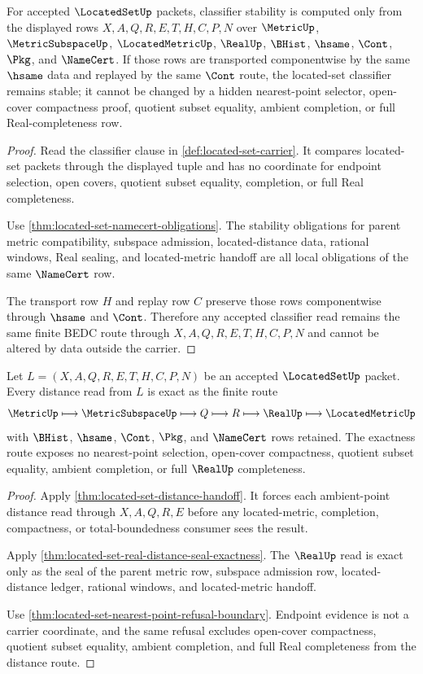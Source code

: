 \begin{theorem}
\label{thm:located-set-classifier-stability}
For accepted $\LocatedSetUp$ packets, classifier stability is computed only from the displayed rows $X,A,Q,R,E,T,H,C,P,N$ over $\MetricUp$, $\MetricSubspaceUp$, $\LocatedMetricUp$, $\RealUp$, $\BHist$, $\hsame$, $\Cont$, $\Pkg$, and $\NameCert$. If those rows are transported componentwise by the same $\hsame$ data and replayed by the same $\Cont$ route, the located-set classifier remains stable; it cannot be changed by a hidden nearest-point selector, open-cover compactness proof, quotient subset equality, ambient completion, or full Real-completeness row.
\end{theorem}
\begin{proof}
Read the classifier clause in \autoref{def:located-set-carrier}. It compares located-set packets through the displayed tuple and has no coordinate for endpoint selection, open covers, quotient subset equality, completion, or full Real completeness.

Use \autoref{thm:located-set-namecert-obligations}. The stability obligations for parent metric compatibility, subspace admission, located-distance data, rational windows, Real sealing, and located-metric handoff are all local obligations of the same $\NameCert$ row.

The transport row $H$ and replay row $C$ preserve those rows componentwise through $\hsame$ and $\Cont$. Therefore any accepted classifier read remains the same finite BEDC route through $X,A,Q,R,E,T,H,C,P,N$ and cannot be altered by data outside the carrier.
\end{proof}

\begin{theorem}
\label{thm:located-set-distance-exactness}
Let $L=(X,A,Q,R,E,T,H,C,P,N)$ be an accepted $\LocatedSetUp$ packet. Every distance read from $L$ is exact as the finite route
$$
\MetricUp \longmapsto \MetricSubspaceUp \longmapsto Q \longmapsto R \longmapsto \RealUp \longmapsto \LocatedMetricUp
$$
with $\BHist$, $\hsame$, $\Cont$, $\Pkg$, and $\NameCert$ rows retained. The exactness route exposes no nearest-point selection, open-cover compactness, quotient subset equality, ambient completion, or full $\RealUp$ completeness.
\end{theorem}
\begin{proof}
Apply \autoref{thm:located-set-distance-handoff}. It forces each ambient-point distance read through $X,A,Q,R,E$ before any located-metric, completion, compactness, or total-boundedness consumer sees the result.

Apply \autoref{thm:located-set-real-distance-seal-exactness}. The $\RealUp$ read is exact only as the seal of the parent metric row, subspace admission row, located-distance ledger, rational windows, and located-metric handoff.

Use \autoref{thm:located-set-nearest-point-refusal-boundary}. Endpoint evidence is not a carrier coordinate, and the same refusal excludes open-cover compactness, quotient subset equality, ambient completion, and full Real completeness from the distance route.
\end{proof}

